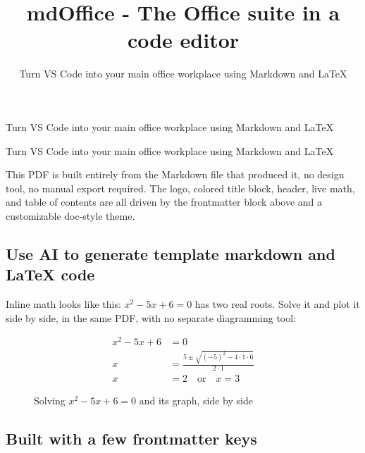 \documentclass[
  11pt,
]{article}
\title{mdOffice - The Office suite in a code editor}
\subtitle{Turn VS Code into your main office workplace using Markdown
and LaTeX}
\author{}
\date{}
\def\mdsubtitle{Turn VS Code into your main office workplace using Markdown and LaTeX}
\def\titlebgpad{8pt}
\renewcommand{\maketitle}{%
    \thispagestyle{plain}%
    \ifdefined\titlebgpad\setlength{\fboxsep}{\titlebgpad}\else\setlength{\fboxsep}{4pt}\fi%
    \noindent\colorbox{mdtitlebg}{%
      \begin{minipage}{\dimexpr\textwidth-2\fboxsep\relax}%
      \Large\bfseries\strut\thetitle\strut%
      \ifdefined\mdsubtitle\\[0.15em]\mdseries\large\mdsubtitle\strut\fi%
      \end{minipage}%
    }%
    \par\vspace{0.8em}%
  }
\renewcommand{\maketitle}{%
    \thispagestyle{plain}%
    \noindent{\Large\bfseries\thetitle\par}%
    \ifdefined\mdsubtitle{\noindent\large\mdsubtitle\par}\fi%
    \vspace{0.8em}%
  }
\begin{document}
\maketitle

{
\setcounter{tocdepth}{3}
\tableofcontents
}
This PDF is built entirely from the Markdown file that produced it, no
design tool, no manual export required. The logo, colored title block,
header, live math, and table of contents are all driven by the
frontmatter block above and a customizable doc-style theme.

\subsection{Use AI to generate template markdown and LaTeX
code}\label{use-ai-to-generate-template-markdown-and-latex-code}

Inline math looks like this: \(x^2 - 5x + 6 = 0\) has two real roots.
Solve it and plot it side by side, in the same PDF, with no separate
diagramming tool:

\begin{figure}[h]
\centering
\begin{minipage}[c]{0.42\textwidth}
\begin{align*}
x^2 - 5x + 6 &= 0 \\
x &= \frac{5 \pm \sqrt{(-5)^2 - 4\cdot 1\cdot 6}}{2\cdot 1} \\
x &= 2 \quad \text{or} \quad x = 3
\end{align*}
\end{minipage}
\hfill
\begin{minipage}[c]{0.5\textwidth}
\centering
{}
\end{minipage}
\caption{Solving $x^2 - 5x + 6 = 0$ and its graph, side by side}
\end{figure}

\subsection{Built with a few frontmatter
keys}\label{built-with-a-few-frontmatter-keys}
\end{document}
